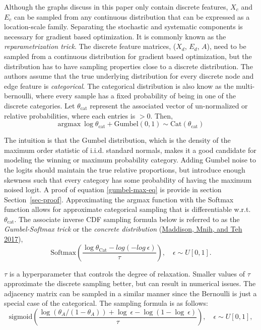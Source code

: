 \documentclass[
  11pt,
  letterpaper,
]{article}
\begin{document}
\quad Although the graphs discuss in this paper only contain discrete
features, \(X_c\) and \(E_c\) can be sampled from any continuous
distribution that can be expressed as a location-scale family.
Separating the stochastic and systematic components is necessary for
gradient based optimization. It is commonly known as the
\emph{reparametrization trick}. The discrete feature matrices, (\(X_d\),
\(E_d\), \(A\)), need to be sampled from a continuous distribution for
gradient based optimization, but the distribution has to have sampling
properties close to a discrete distribution. The authors assume that the
true underlying distribution for every discrete node and edge feature is
\emph{categorical}. The categorical distribution is also know as the
multi-bernoulli, where every sample has a fixed probability of being in
one of the discrete categories. Let \(\theta_\text{cat}\) represent the
associated vector of un-normalized or relative probabilities, where each
entries is \(>0\). Then, \begin{equation} \label{gumbel-max-eq}
    \text{argmax} \ \log \theta_\text{cat} + \text{Gumbel}(0, 1)
        \sim \text{Cat}(\theta_\text{cat})
\end{equation}

The intuition is that the Gumbel distribution, which is the density of
the maximum order statistic of i.i.d. standard normals, makes it a good
candidate for modeling the winning or maximum probability category.
Adding Gumbel noise to the logits should maintain the true relative
proportions, but introduce enough skewness such that every category has
some probability of having the maximum noised logit. A proof of equation
\ref{gumbel-max-eq} is provide in section Section~\ref{sec-proof}.
Approximating the argmax function with the Softmax function allows for
approximate categorical sampling that is differentiable w.r.t.
\(\theta_\text{cat}\). The associate inverse CDF sampling formula below
is referred to as the \emph{Gumbel-Softmax trick} or the \emph{concrete
distribution} (\protect\hyperlink{ref-Maddison_Mnih_Teh_2017}{Maddison,
Mnih, and Teh 2017}),\\
\begin{equation}
    \text{Softmax}
    \left(
        \dfrac{\log \theta_{\text{Cat}} - log(-log \ \epsilon)}{\tau}
    \right), \quad \epsilon \sim U[0, 1].
\end{equation}

\(\tau\) is a hyperparameter that controls the degree of relaxation.
Smaller values of \(\tau\) approximate the discrete sampling better, but
can result in numerical issues. The adjacency matrix can be sampled in a
similar manner since the Bernoulli is just a special case of the
categorical. The sampling formula is as follows:\\
\begin{equation} \label{binary-concrete}
        \text{sigmoid}
            \left(\dfrac{\log(\theta_A / (1 - \theta_A)) + \log \ \epsilon - \log(1 - \log \ \epsilon)}{\tau} \right), \quad \epsilon \sim U[0, 1], 
    \end{equation}
\end{document}
